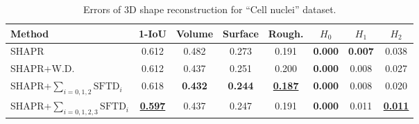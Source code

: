 \documentclass[runningheads]{llncs}
\begin{document}
\begin{table}[hp!]
\caption{Errors of 3D shape reconstruction for ``Cell nuclei'' dataset.}
\label{tbl:SHAPR_cell_nuclei}
\begin{center}
\begin{small}
\begin{sc}
\begin{tabular}{lccccccc}
\toprule
Method & 1-IoU & Volume & Surface & Rough. & $H_0$ & $H_1$ & $H_2$\\
\midrule
SHAPR \cite{waibel2022shapr}            & 0.612 & 0.482 & 0.273 & {0.191} & \textbf{0.000} & \textbf{0.007} & 0.038 \\
SHAPR+W.D. \cite{waibel2022capturing} & 0.612 & {0.437} & 0.251 & 0.200 & \textbf{0.000} & 0.008 & 0.027\\
SHAPR+$\sum_{i=0, 1, 2} \text{SFTD}_i$  & {0.618} & \textbf{0.432} & \textbf{0.244} & \textbf{\underline{0.187}} & \textbf{0.000} & {0.008} & 0.020\\
SHAPR+$\sum_{i=0, 1, 2, 3} \text{SFTD}_i$  & \textbf{\underline{0.597}} & {0.437} & {0.247} & {0.191} & \textbf{0.000} & 0.011 & \underline{\textbf{0.011}}\\


\bottomrule
\end{tabular}
\end{sc}
\end{small}
\end{center}
\end{table}

\end{document}

